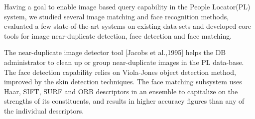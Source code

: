 
\begin{xpsectionbox}{}{}
Having a goal to enable image based query capability in the People Locator\texttrademark (PL) system, we studied several image matching and face recognition methods, evaluated a few state-of-the-art systems on existing data-sets and developed core tools for image near-duplicate detection, face detection and face matching.

The near-duplicate image detector tool [Jacobs et al.,1995] helps the DB administrator to clean up or group near-duplicate images in the PL data-base. The face detection capability relies on Viola-Jones object detection method, improved by the skin detection techniques. The face matching subsystem uses Haar, SIFT, SURF and ORB descriptors in an ensemble to capitalize on the strengths of its constituents, and results in higher accuracy figures than any of the individual descriptors.

\end{xpsectionbox}



